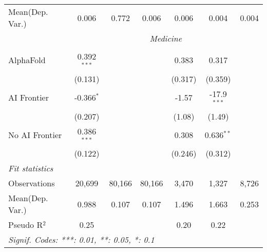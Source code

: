 \begin{tabular}{lcccccc}
Mean(Dep. Var.) & 0.006 & 0.772 & 0.006 & 0.006 & 0.004 & 0.004 \\
 & \multicolumn{6}{c}{\textit{Medicine}} \\ \\
   AlphaFold      & 0.392$^{***}$ &        &        & 0.383     & 0.317         &   \\   
                  & (0.131)       &        &        & (0.317)   & (0.359)       &   \\   
   AI Frontier    & -0.366$^{*}$  &        &        & -1.57     & -17.9$^{***}$ &   \\   
                  & (0.207)       &        &        & (1.08)    & (1.49)        &   \\   
   No AI Frontier & 0.386$^{***}$ &        &        & 0.308     & 0.636$^{**}$  &   \\   
                  & (0.122)       &        &        & (0.246)   & (0.312)       &   \\   
   \midrule
   \emph{Fit statistics}\\
   Observations   & 20,699        & 80,166 & 80,166 & 3,470     & 1,327         & 8,726\\  
Mean(Dep. Var.) & 0.988 & 0.107 & 0.107 & 1.496 & 1.663 & 0.253 \\
   Pseudo R$^2$   & 0.25          &        &        & 0.20      & 0.22          & \\  
   \midrule \midrule
   \multicolumn{7}{l}{\emph{Signif. Codes: ***: 0.01, **: 0.05, *: 0.1}}\\
\end{tabular}
\par\endgroup
